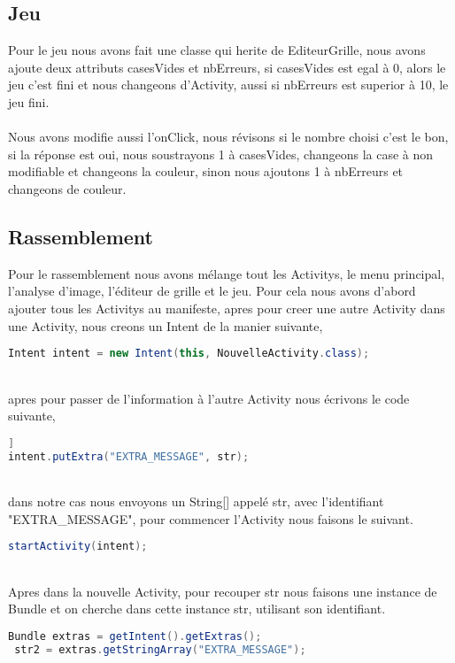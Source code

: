 \documentclass{article}
\begin{document}
\subsection{Jeu}
Pour le jeu nous avons fait une classe qui herite de EditeurGrille, nous avons ajoute deux attributs casesVides et nbErreurs, si casesVides est egal à 0, alors le jeu c'est fini et nous changeons d'Activity, aussi si nbErreurs est superior à 10, le jeu fini.
\\
\\
Nous avons modifie aussi l'onClick, nous révisons si le nombre choisi c'est le bon, si la réponse est oui, nous  soustrayons 1 à casesVides, changeons la case à non modifiable et changeons la couleur, sinon nous ajoutons 1 à nbErreurs et changeons de couleur.

\subsection{Rassemblement}
Pour le rassemblement nous avons mélange tout les Activitys, le menu principal, l'analyse d'image, l'éditeur de grille et le jeu. Pour cela nous avons d'abord ajouter tous les Activitys au manifeste, apres pour creer une autre Activity dans une Activity, nous creons un Intent de la manier suivante,
\begin{lstlisting}[language=Java, caption = Creation Intent] 
Intent intent = new Intent(this, NouvelleActivity.class);
\end{lstlisting}
\\
apres pour passer de l'information à l'autre Activity nous écrivons le code suivante,
\begin{lstlisting}[language=Java, caption = Envoyer un String[]] 
intent.putExtra("EXTRA_MESSAGE", str);
\end{lstlisting}
\\
dans notre cas nous envoyons un String[] appelé str, avec l'identifiant "EXTRA\_MESSAGE", pour commencer l'Activity nous faisons le suivant.
\begin{lstlisting}[language=Java, caption = Commencer une Activity] 
 startActivity(intent);
\end{lstlisting}
\\
Apres dans la nouvelle Activity, pour recouper str nous faisons une instance de Bundle et on cherche dans cette instance str, utilisant son identifiant.
\begin{lstlisting}[language=Java, caption = Récupérer une valeur] 
 Bundle extras = getIntent().getExtras();
 str2 = extras.getStringArray("EXTRA_MESSAGE");
\end{lstlisting}
\\
\end{document}
